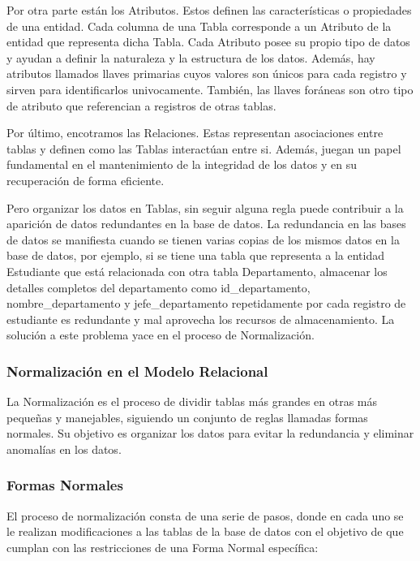 Por otra parte est\'an los Atributos. Estos definen las características o propiedades de una entidad. Cada columna de una 
Tabla corresponde a un Atributo de la entidad que representa dicha Tabla. Cada Atributo posee su propio tipo de datos y 
ayudan a definir la naturaleza y la estructura de los datos. Además, hay atributos llamados llaves primarias cuyos 
valores son \'unicos para cada registro y sirven para identificarlos univocamente. También, las llaves for\'aneas son 
otro tipo de atributo que referencian a registros de otras tablas.

Por \'ultimo, encotramos las Relaciones. Estas representan asociaciones entre tablas y definen como las Tablas interactúan
entre si. Además, juegan un papel fundamental en el mantenimiento de la integridad de los datos y en su recuperación de forma 
eficiente. 

Pero organizar los datos en Tablas, sin seguir alguna regla puede contribuir a la aparici\'on de datos redundantes en la 
base de datos. La redundancia en las bases de datos se manifiesta cuando se tienen varias copias de los mismos datos en la 
base de datos, por ejemplo, si se tiene una tabla que representa a la entidad Estudiante que est\'a relacionada con otra 
tabla Departamento, almacenar los detalles completos del departamento como id\_departamento, nombre\_departamento y 
jefe\_departamento repetidamente por cada registro de estudiante es redundante y mal aprovecha los recursos de 
almacenamiento. La soluci\'on a este problema yace en el proceso de Normalización.


\subsubsection{Normalización en el Modelo Relacional}

La Normalización es el proceso de dividir tablas m\'as grandes en otras m\'as pequeñas y manejables, siguiendo 
un conjunto de reglas llamadas formas normales. Su objetivo es organizar los datos para evitar la redundancia y 
eliminar anomalías en los datos.


\subsubsection{Formas Normales}

El proceso de normalizaci\'on consta de una serie de pasos, donde en cada uno se le realizan modificaciones a las tablas de 
la base de datos con el objetivo de que cumplan con las restricciones de una Forma Normal específica:

